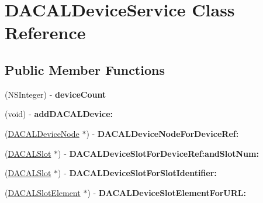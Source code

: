 \hypertarget{interface_d_a_c_a_l_device_service}{
\section{DACALDeviceService Class Reference}
\label{interface_d_a_c_a_l_device_service}
}
\subsection*{Public Member Functions}
\begin{DoxyCompactItemize}
\item 
\hypertarget{interface_d_a_c_a_l_device_service_af4bff3edf11c8656ea669ed4c155a6a4}{
(NSInteger) -\/ {\bfseries deviceCount}}
\label{interface_d_a_c_a_l_device_service_af4bff3edf11c8656ea669ed4c155a6a4}

\item 
\hypertarget{interface_d_a_c_a_l_device_service_af03047c19c967fd19f253e82c996c81a}{
(void) -\/ {\bfseries addDACALDevice:}}
\label{interface_d_a_c_a_l_device_service_af03047c19c967fd19f253e82c996c81a}

\item 
\hypertarget{interface_d_a_c_a_l_device_service_aa5a61888327fb5d8c6bc2d8e2257daa5}{
(\hyperlink{interface_d_a_c_a_l_device_node}{DACALDeviceNode} $\ast$) -\/ {\bfseries DACALDeviceNodeForDeviceRef:}}
\label{interface_d_a_c_a_l_device_service_aa5a61888327fb5d8c6bc2d8e2257daa5}

\item 
\hypertarget{interface_d_a_c_a_l_device_service_a3e28cbd0648d1d1e10d71d34b1f4272b}{
(\hyperlink{interface_d_a_c_a_l_slot}{DACALSlot} $\ast$) -\/ {\bfseries DACALDeviceSlotForDeviceRef:andSlotNum:}}
\label{interface_d_a_c_a_l_device_service_a3e28cbd0648d1d1e10d71d34b1f4272b}

\item 
\hypertarget{interface_d_a_c_a_l_device_service_a2f6e35d82e658cde35bbc71eee354114}{
(\hyperlink{interface_d_a_c_a_l_slot}{DACALSlot} $\ast$) -\/ {\bfseries DACALDeviceSlotForSlotIdentifier:}}
\label{interface_d_a_c_a_l_device_service_a2f6e35d82e658cde35bbc71eee354114}

\item 
\hypertarget{interface_d_a_c_a_l_device_service_ab9ee76e7df05e7c295f08e788ddb5674}{
(\hyperlink{interface_d_a_c_a_l_slot_element}{DACALSlotElement} $\ast$) -\/ {\bfseries DACALDeviceSlotElementForURL:}}
\label{interface_d_a_c_a_l_device_service_ab9ee76e7df05e7c295f08e788ddb5674}


\end{DoxyCompactItemize}
